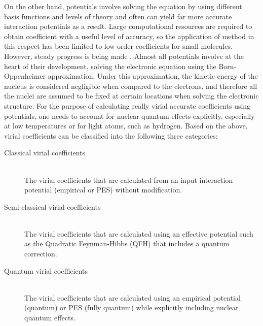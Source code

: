         On the other hand, \abInitio{} potentials involve solving the \Schrodinger{} equation by using different basis functions and levels of theory and often can yield far more accurate interaction potentials as a result. Large computational resources are required to obtain coefficient with a useful level of accuracy, so the application of \abInitio{} method in this respect has been limited to low-order coefficients for small molecules. However, steady progress is being made \cite{Boothroyd2003,Hodges2004,Garberoglio2012,Shaul2012,Garberoglio2013,Hellmann2013,Garberoglio2014,Garberoglio2014mix,Hellmann2014,Schultz2015,Tat2015}. Almost all \abInitio{} potentials involve at the heart of their development, solving the electronic \Schrodinger{} equation using the Born-Oppenheimer approximation. Under this approximation, the kinetic energy of the nucleus is considered negligible when compared to the electrons, and therefore all the nuclei are assumed to be fixed at certain locations when solving the electronic structure. For the purpose of calculating really virial accurate coefficients using \abInitio{} potentials, one needs to account for nuclear quantum effects explicitly, especially at low temperatures or for light atoms, such as hydrogen. Based on the above, virial coefficients can be classified into the following three categories:

        \begin{description}
            \item[Classical virial coefficients] \hfill \\
                The virial coefficients that are calculated from an input interaction potential (empirical or \abInitio{} PES) without modification.
            \item[Semi-classical virial coefficients] \hfill \\
                The virial coefficients that are calculated using an effective potential such as the Quadratic Feynman-Hibbs (QFH) \cite{Feynman} that includes a quantum correction.
            \item[Quantum virial coefficients] \hfill \\
                The virial coefficients that are calculated using an empirical potential (quantum) or \abInitio{} PES (fully quantum) while explicitly including nuclear quantum effects.
        \end{description}
